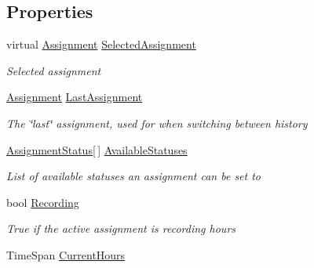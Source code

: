 \subsection*{Properties}
\begin{DoxyCompactItemize}
\item 
virtual \hyperlink{class_field_service_1_1_data_1_1_assignment}{Assignment} \hyperlink{class_field_service_1_1_view_models_1_1_assignment_view_model_a5bbbd8f4c5594233117d7b9a3726940c}{Selected\+Assignment}
\begin{DoxyCompactList}\small\item\em Selected assignment \end{DoxyCompactList}\item 
\hyperlink{class_field_service_1_1_data_1_1_assignment}{Assignment} \hyperlink{class_field_service_1_1_view_models_1_1_assignment_view_model_a8e4b3bebf707937794a039f0bf7431b5}{Last\+Assignment}
\begin{DoxyCompactList}\small\item\em The \char`\"{}last\char`\"{} assignment, used for when switching between history \end{DoxyCompactList}\item 
\hyperlink{namespace_field_service_1_1_data_a87f0c66830f2bf43c90c245213fc3263}{Assignment\+Status}\mbox{[}$\,$\mbox{]} \hyperlink{class_field_service_1_1_view_models_1_1_assignment_view_model_ac4318df5ceb0e9bce053310d5cdd0e55}{Available\+Statuses}
\begin{DoxyCompactList}\small\item\em List of available statuses an assignment can be set to \end{DoxyCompactList}\item 
bool \hyperlink{class_field_service_1_1_view_models_1_1_assignment_view_model_a869d106839c37753e8996fffffddfe0a}{Recording}
\begin{DoxyCompactList}\small\item\em True if the active assignment is recording hours \end{DoxyCompactList}\item 
Time\+Span \hyperlink{class_field_service_1_1_view_models_1_1_assignment_view_model_af2ad8f0c8191aac2a29adb3dae4981c5}{Current\+Hours}

\end{DoxyCompactItemize}
